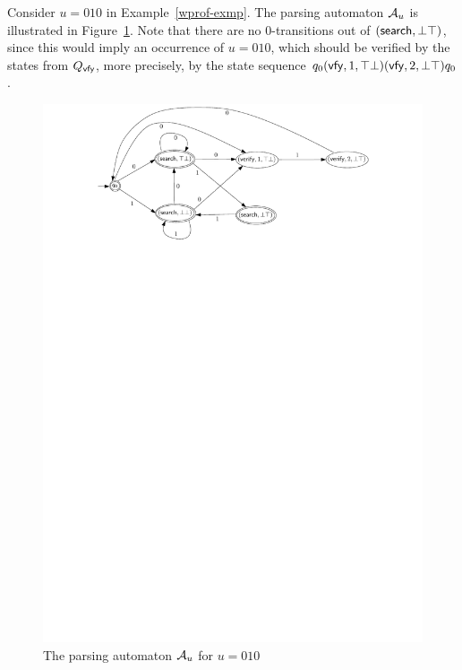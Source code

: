 
\begin{example}
Consider $u=010$ in Example~\ref{wprof-exmp}. The parsing automaton  $\mathcal{A}_u$ is illustrated in Figure~\ref{fig-pa-exmp}. Note that there are no $0$-transitions out of $(\mathsf{search}, \bot\top)$, since this would imply an occurrence of $u = 010$, which should be verified by the states from $Q_{\mathsf{vfy}}$, more precisely, by the state sequence $q_0 (\mathsf{vfy}, 1, \top\bot) (\mathsf{vfy}, 2, \bot\top)q_0$.
\begin{figure}[htbp]
\begin{center}
\includegraphics[scale=0.55]{parsing-automata-example.pdf}
\end{center}
\caption{The parsing automaton $\mathcal{A}_u$ for $u = 010$}\label{fig-pa-exmp}
\end{figure}
\end{example}


